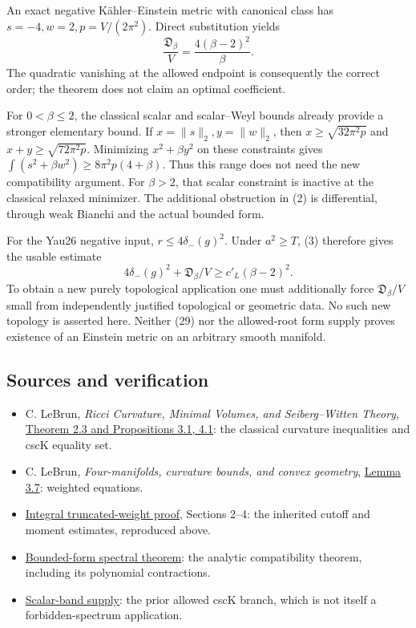 \documentclass[
  11pt,
]{article}
\providecommand{\tightlist}{%
  \setlength{\itemsep}{0pt}\setlength{\parskip}{0pt}}
\begin{document}
An exact negative Kähler--Einstein metric with canonical class has
\(s=-4,w=2,p=V/(2\pi^2)\). Direct substitution yields \[
\frac{\mathfrak D_\beta}{V}
=\frac{4(\beta-2)^2}{\beta}.
\tag{28}
\] The quadratic vanishing at the allowed endpoint is consequently the
correct order; the theorem does not claim an optimal coefficient.

For \(0<\beta\le2\), the classical scalar and scalar--Weyl bounds
already provide a stronger elementary bound. If \(x=\|s\|_2,y=\|w\|_2\),
then \(x\ge\sqrt{32\pi^2p}\) and \(x+y\ge\sqrt{72\pi^2p}\). Minimizing
\(x^2+\beta y^2\) on these constraints gives
\(\int(s^2+\beta w^2) \ge8\pi^2p(4+\beta)\). Thus this range does not
need the new compatibility argument. For \(\beta>2\), that scalar
constraint is inactive at the classical relaxed minimizer. The
additional obstruction in (2) is differential, through weak Bianchi and
the actual bounded form.

For the Yau26 negative input, \(r\le4\delta_-(g)^2\). Under
\(a^2\ge T\), (3) therefore gives the usable estimate \[
4\delta_-(g)^2+\mathfrak D_\beta/V
\ge c'_L(\beta-2)^2.
\tag{29}
\] To obtain a new purely topological application one must additionally
force \(\mathfrak D_\beta/V\) small from independently justified
topological or geometric data. No such new topology is asserted here.
Neither (29) nor the allowed-root form supply proves existence of an
Einstein metric on an arbitrary smooth manifold.

\hypertarget{sources-and-verification}{%
\subsection{Sources and verification}\label{sources-and-verification}}

\begin{itemize}
\tightlist
\item
  C. LeBrun, \emph{Ricci Curvature, Minimal Volumes, and Seiberg--Witten
  Theory}, \href{https://arxiv.org/abs/math/0003068}{Theorem 2.3 and
  Propositions 3.1, 4.1}: the classical curvature inequalities and cscK
  equality set.
\item
  C. LeBrun, \emph{Four-manifolds, curvature bounds, and convex
  geometry}, \href{https://arxiv.org/abs/math/0611450}{Lemma 3.7}:
  weighted equations.
\item
  \href{round4_rigidity.md}{Integral truncated-weight proof}, Sections
  2--4: the inherited cutoff and moment estimates, reproduced above.
\item
  \href{round21_analytic.md}{Bounded-form spectral theorem}: the
  analytic compatibility theorem, including its polynomial contractions.
\item
  \href{line1_scalar_band_remainder.md}{Scalar-band supply}: the prior
  allowed cscK branch, which is not itself a forbidden-spectrum
  application.
\end{itemize}
\end{document}
